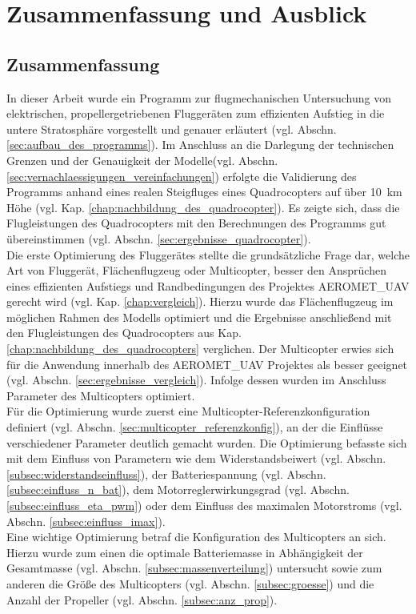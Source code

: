 \chapter{Zusammenfassung und Ausblick}

\section{Zusammenfassung}
In dieser Arbeit wurde ein Programm zur flugmechanischen Untersuchung von elektrischen, propellergetriebenen Fluggeräten zum effizienten Aufstieg in die untere Stratosphäre vorgestellt und genauer erläutert (vgl. Abschn. \ref{sec:aufbau_des_programms}). Im Anschluss an die Darlegung der technischen Grenzen und der Genauigkeit der Modelle(vgl. Abschn. \ref{sec:vernachlaessigungen_vereinfachungen}) erfolgte die Validierung des Programms anhand eines realen Steigfluges eines Quadrocopters auf über \SI{10}{km} Höhe (vgl. Kap. \ref{chap:nachbildung_des_quadrocopter}). Es zeigte sich, dass die Flugleistungen des Quadrocopters mit den Berechnungen des Programms gut übereinstimmen (vgl. Abschn. \ref{sec:ergebnisse_quadrocopter}). \\
Die erste Optimierung des Fluggerätes stellte die grundsätzliche Frage dar, welche Art von Fluggerät, Flächenflugzeug oder Multicopter, besser den Ansprüchen eines effizienten Aufstiegs und Randbedingungen des Projektes AEROMET\_UAV gerecht wird (vgl. Kap. \ref{chap:vergleich}). Hierzu wurde das Flächenflugzeug im möglichen Rahmen des Modells optimiert und die Ergebnisse anschließend mit den Flugleistungen des Quadrocopters aus Kap. \ref{chap:nachbildung_des_quadrocopters} verglichen. Der Multicopter erwies sich für die Anwendung innerhalb des AEROMET\_UAV Projektes als besser geeignet (vgl. Abschn. \ref{sec:ergebnisse_vergleich}). Infolge dessen wurden im Anschluss Parameter des Multicopters optimiert. \\
Für die Optimierung wurde zuerst eine Multicopter-Referenzkonfiguration definiert (vgl. Abschn. \ref{sec:multicopter_referenzkonfig}), an der die Einflüsse verschiedener Parameter deutlich gemacht wurden. Die Optimierung befasste sich mit dem Einfluss von Parametern wie dem Widerstandsbeiwert (vgl. Abschn. \ref{subsec:widerstandseinfluss}), der Batteriespannung (vgl. Abschn. \ref{subsec:einfluss_n_bat}), dem Motorreglerwirkungsgrad (vgl. Abschn. \ref{subsec:einfluss_eta_pwm}) oder dem Einfluss des maximalen Motorstroms (vgl. Abschn. \ref{subsec:einfluss_imax}).\\
Eine wichtige Optimierung betraf die Konfiguration des Multicopters an sich. Hierzu wurde zum einen die optimale Batteriemasse in Abhängigkeit der Gesamtmasse (vgl. Abschn. \ref{subsec:massenverteilung}) untersucht sowie zum anderen die Größe des Multicopters (vgl. Abschn. \ref{subsec:groesse}) und die Anzahl der Propeller (vgl. Abschn. \ref{subsec:anz_prop}). 
